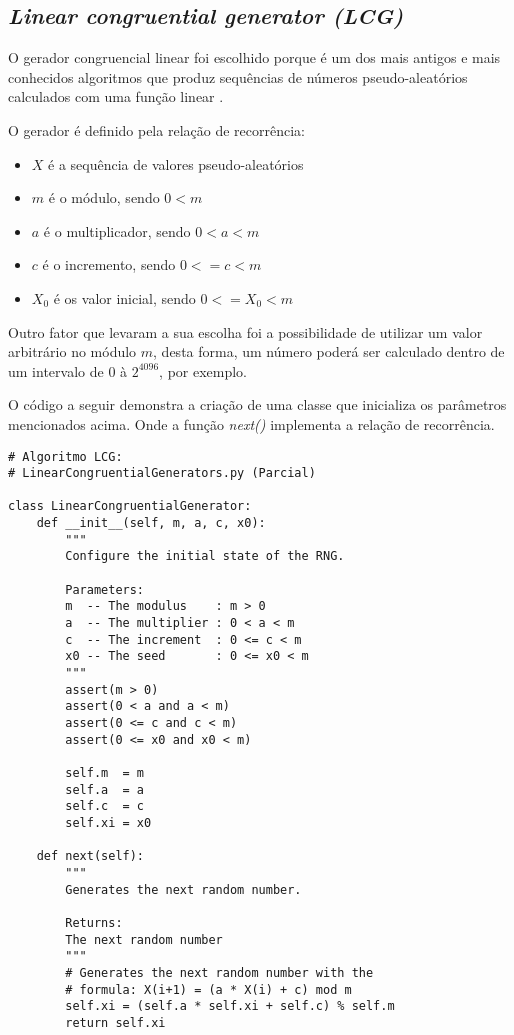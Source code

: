 \documentclass{article}
\begin{document}
\subsection{\textit{Linear congruential generator (LCG)}}
\label{lcg-parcial}

O gerador congruencial linear foi escolhido porque é um dos mais antigos e mais conhecidos algoritmos que produz sequências de números pseudo-aleatórios calculados com uma função linear \cite{bib:lcg1}.

O gerador é definido pela relação de recorrência:

{
    \begin{itemize}
	    \item $X$ é a sequência de valores pseudo-aleatórios
	    \item $m$ é o módulo, sendo $0 < m$
	    \item $a$ é o multiplicador, sendo $0 < a < m$
	    \item $c$ é o incremento, sendo $0 <= c < m$
	    \item $X_0$ é os valor inicial, sendo $0 <= X_0 < m$ 
    \end{itemize}
}
    
Outro fator que levaram a sua escolha foi a possibilidade de utilizar um valor arbitrário no módulo $m$, desta forma, um número poderá ser calculado dentro de um intervalo de $0$ à $2^{4096}$, por exemplo.

O código a seguir demonstra a criação de uma classe que inicializa os parâmetros mencionados acima. Onde a função \textit{next()} implementa a relação de recorrência.

\begin{lstlisting}
# Algoritmo LCG:
# LinearCongruentialGenerators.py (Parcial)

class LinearCongruentialGenerator:
	def __init__(self, m, a, c, x0):
		"""
		Configure the initial state of the RNG.

		Parameters:
		m  -- The modulus    : m > 0
		a  -- The multiplier : 0 < a < m 
		c  -- The increment  : 0 <= c < m
		x0 -- The seed       : 0 <= x0 < m
		"""
		assert(m > 0)
		assert(0 < a and a < m)
		assert(0 <= c and c < m)
		assert(0 <= x0 and x0 < m)

		self.m  = m
		self.a  = a
		self.c  = c
		self.xi = x0

	def next(self):
		"""
		Generates the next random number.

		Returns:
		The next random number
		"""
		# Generates the next random number with the
		# formula: X(i+1) = (a * X(i) + c) mod m
		self.xi = (self.a * self.xi + self.c) % self.m
		return self.xi
\end{lstlisting}
\end{document}
